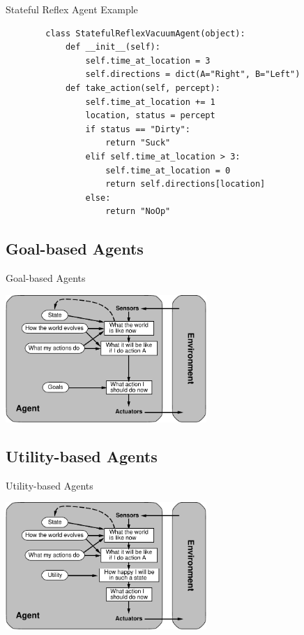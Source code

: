 \documentclass[14pt]{beamer}
\begin{document}
\begin{frame}[fragile]{Stateful Reflex Agent Example}
	\footnotesize
	\begin{lstlisting}
		class StatefulReflexVacuumAgent(object):
		    def __init__(self):
		        self.time_at_location = 3
		        self.directions = dict(A="Right", B="Left")
		    def take_action(self, percept):
		        self.time_at_location += 1
		        location, status = percept
		        if status == "Dirty":
		            return "Suck"
		        elif self.time_at_location > 3:
		            self.time_at_location = 0
		            return self.directions[location]
		        else:
		            return "NoOp"
	\end{lstlisting}
\end{frame}


\subsection{Goal-based Agents}
\begin{frame}{Goal-based Agents}
	\begin{center}
		\includegraphics[width=3in]{goal-based-agent.pdf}
	\end{center}
\end{frame}

\subsection{Utility-based Agents}
\begin{frame}{Utility-based Agents}
	\begin{center}
		\includegraphics[width=3in]{utility-based-agent.pdf}
	\end{center}
\end{frame}
\end{document}
